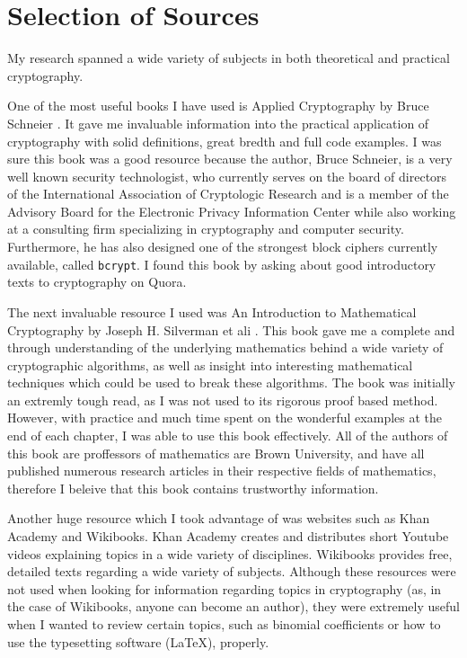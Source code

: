 \documentclass[12pt, a4paper, draft]{report}
\begin{document}
\section*{Selection of Sources}

My research spanned a wide variety of subjects in both theoretical and
practical cryptography.

One of the most useful books I have used is Applied Cryptography
by Bruce Schneier \cite{schneier}. It gave me invaluable information into the
practical application of cryptography with solid definitions,
great bredth and full code examples. I was sure this book was a good
resource because the author, Bruce Schneier, is a very well known
security technologist, who currently serves on the board of directors
of the International Association of Cryptologic Research and is a member
of the Advisory Board for the Electronic Privacy Information Center while
also working at a consulting firm specializing in cryptography and computer
security. Furthermore, he has also designed one of the strongest block
ciphers currently available, called \texttt{bcrypt}. I found this book
by asking about good introductory texts to cryptography on Quora.


The next invaluable resource I used was An Introduction to Mathematical
Cryptography by Joseph H. Silverman et ali \cite{matcrypt}. This book gave me
a complete and through understanding of the underlying mathematics behind
a wide variety of cryptographic algorithms, as well as insight into
interesting mathematical techniques which could be used to break these
algorithms. The book was initially an extremly tough read, as I was not used
to its rigorous proof based method. However, with practice and much time
spent on the wonderful examples at the end of each chapter, I was able to
use this book effectively. All of the authors of this book are proffessors
of mathematics are Brown University, and have all published numerous
research articles in their respective fields of mathematics, therefore I
beleive that this book contains trustworthy information.

Another huge resource which I took advantage of was websites such as
Khan Academy and Wikibooks. Khan Academy creates and distributes short
Youtube videos explaining topics in a wide variety of disciplines.
Wikibooks provides free, detailed texts regarding a wide variety of
subjects. Although these resources were not used when looking for
information regarding topics in cryptography (as, in the case of Wikibooks,
anyone can become an author), they were extremely useful when I wanted
to review certain topics, such as binomial coefficients or how to use
the typesetting software ({\LaTeX}), properly.
\end{document}
